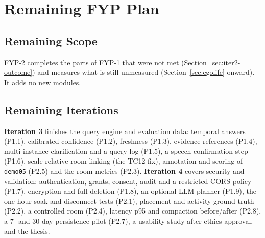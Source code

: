 \chapter{Remaining FYP Plan}
\label{chap:fyp2}

\section{Remaining Scope}
FYP-2 completes the parts of FYP-1 that were not met (Section~\ref{sec:iter2-outcome})
and measures what is still unmeasured (Section~\ref{sec:egolife} onward). It adds
no new modules.

\section{Remaining Iterations}
\textbf{Iteration 3} finishes the query engine and evaluation data: temporal
answers (P1.1), calibrated confidence (P1.2), freshness (P1.3), evidence
references (P1.4), multi-instance clarification and a query log (P1.5), a speech
confirmation step (P1.6), scale-relative room linking (the TC12 fix), annotation
and scoring of \texttt{demo05} (P2.5) and the room metrics (P2.3).
\textbf{Iteration 4} covers security and validation: authentication, grants,
consent, audit and a restricted CORS policy (P1.7), encryption and full deletion
(P1.8), an optional LLM planner (P1.9), the one-hour soak and disconnect tests
(P2.1), placement and activity ground truth (P2.2), a controlled room (P2.4),
latency p95 and compaction before/after (P2.8), a 7- and 30-day persistence pilot
(P2.7), a usability study after ethics approval, and the thesis.


